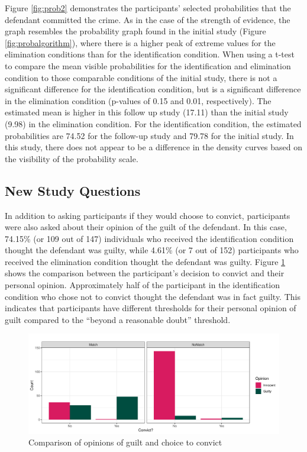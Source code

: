 \documentclass[print]{nuthesis}
\begin{document}
Figure \ref{fig:prob2} demonstrates the participants' selected probabilities that the defendant committed the crime.
As in the case of the strength of evidence, the graph resembles the probability graph found in the initial study (Figure \ref{fig:probalgorithm}), where there is a higher peak of extreme values for the elimination conditions than for the identification condition.
When using a t-test to compare the mean visible probabilities for the identification and elimination condition to those comparable conditions of the initial study, there is not a significant difference for the identification condition, but is a significant difference in the elimination condition (p-values of 0.15 and 0.01, respectively).
The estimated mean is higher in this follow up study (17.11) than the initial study (9.98) in the elimination condition.
For the identification condition, the estimated probabilities are 74.52 for the follow-up study and 79.78 for the initial study.
In this study, there does not appear to be a difference in the density curves based on the visibility of the probability scale.

\hypertarget{new-study-questions}{%
\subsection{New Study Questions}\label{new-study-questions}}

In addition to asking participants if they would choose to convict, participants were also asked about their opinion of the guilt of the defendant.
In this case, 74.15\% (or 109 out of 147) individuals who received the identification condition thought the defendant was guilty, while 4.61\% (or 7 out of 152) participants who received the elimination condition thought the defendant was guilty.
Figure \ref{fig:opinionguilt} shows the comparison between the participant's decision to convict and their personal opinion.
Approximately half of the participant in the identification condition who chose not to convict thought the defendant was in fact guilty.
This indicates that participants have different thresholds for their personal opinion of guilt compared to the ``beyond a reasonable doubt'' threshold.

\begin{figure}

{\centering \includegraphics[width=\linewidth]{thesis_files/figure-latex/opinionguilt-1} 

}

\caption{Comparison of opinions of guilt and choice to convict}\label{fig:opinionguilt}
\end{figure}
\end{document}

